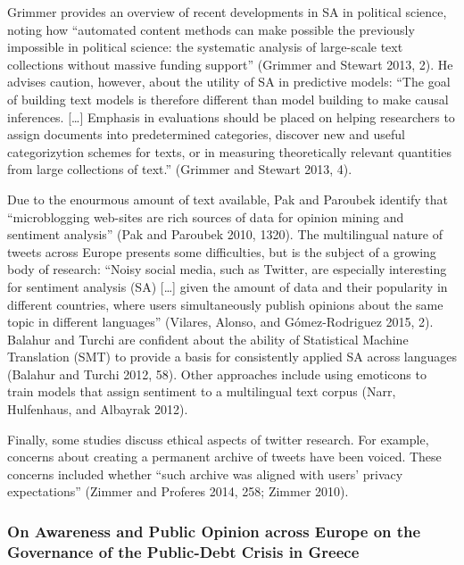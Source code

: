 \documentclass[]{article}
\begin{document}
Grimmer provides an overview of recent developments in SA in political
science, noting how ``automated content methods can make possible the
previously impossible in political science: the systematic analysis of
large-scale text collections without massive funding support'' (Grimmer
and Stewart 2013, 2). He advises caution, however, about the utility of
SA in predictive models: ``The goal of building text models is therefore
different than model building to make causal inferences. {[}\ldots{}{]}
Emphasis in evaluations should be placed on helping researchers to
assign documents into predetermined categories, discover new and useful
categorizytion schemes for texts, or in measuring theoretically relevant
quantities from large collections of text.'' (Grimmer and Stewart 2013,
4).

Due to the enourmous amount of text available, Pak and Paroubek identify
that ``microblogging web-sites are rich sources of data for opinion
mining and sentiment analysis'' (Pak and Paroubek 2010, 1320). The
multilingual nature of tweets across Europe presents some difficulties,
but is the subject of a growing body of research: ``Noisy social media,
such as Twitter, are especially interesting for sentiment analysis (SA)
{[}\ldots{}{]} given the amount of data and their popularity in
different countries, where users simultaneously publish opinions about
the same topic in different languages'' (Vilares, Alonso, and
G{ó}mez-Rodr{i}guez 2015, 2). Balahur and Turchi are confident about the
ability of Statistical Machine Translation (SMT) to provide a basis for
consistently applied SA across languages (Balahur and Turchi 2012, 58).
Other approaches include using emoticons to train models that assign
sentiment to a multilingual text corpus (Narr, Hulfenhaus, and Albayrak
2012).

Finally, some studies discuss ethical aspects of twitter research. For
example, concerns about creating a permanent archive of tweets have been
voiced. These concerns included whether ``such archive was aligned with
users' privacy expectations'' (Zimmer and Proferes 2014, 258; Zimmer
2010).

\subsubsection{On Awareness and Public Opinion across Europe on the
Governance of the Public-Debt Crisis in
Greece}\label{on-awareness-and-public-opinion-across-europe-on-the-governance-of-the-public-debt-crisis-in-greece}
\end{document}
